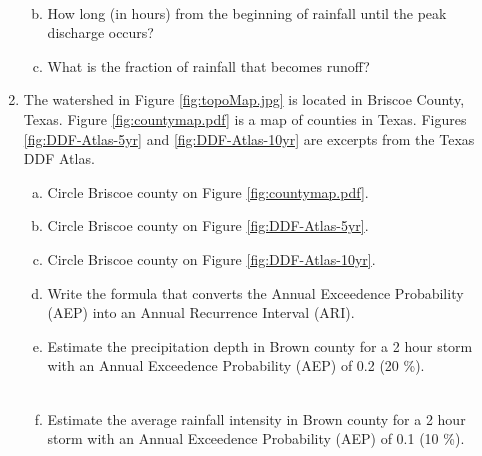 \documentclass[12pt]{article}
\begin{document}
\begin{enumerate}
\begin{enumerate}[a)]
~\newline
~\newline
~\newline
~\newline
~\newline
\item How long (in hours) from the beginning of rainfall until the peak discharge occurs?
~\newline
~\newline
~\newline
~\newline
~\newline
\item What is the fraction of rainfall that becomes runoff?
\end{enumerate}
\clearpage
\item  The watershed in Figure \ref{fig:topoMap.jpg} is located in Briscoe County, Texas. Figure \ref{fig:countymap.pdf} is a map of
counties in Texas. Figures  \ref{fig:DDF-Atlas-5yr} and \ref{fig:DDF-Atlas-10yr} are excerpts from the Texas DDF Atlas.
\begin{enumerate}[a)]
\item Circle Briscoe county on Figure \ref{fig:countymap.pdf}.
\item Circle Briscoe county on Figure \ref{fig:DDF-Atlas-5yr}.
\item Circle Briscoe county on Figure \ref{fig:DDF-Atlas-10yr}.
\item Write the formula that converts the Annual Exceedence Probability (AEP) into an Annual Recurrence Interval (ARI).
~\newline
~\newline
~\newline
~\newline
~\newline
~\newline
~\newline
\item Estimate the precipitation depth in Brown county for a 2 hour storm with an Annual Exceedence Probability (AEP) of 0.2 (20 \%).
~\newline
~\newline
~\newline
~\newline
~\newline
~\newline
~\newline
\item Estimate the average rainfall intensity in Brown county for a 2 hour storm with an Annual Exceedence Probability (AEP) of 0.1 (10 \%).
~\newline
~\newline
~\newline
~\newline
~\newline
~\newline
~\newline
\end{enumerate}


\end{enumerate}
\end{document}
